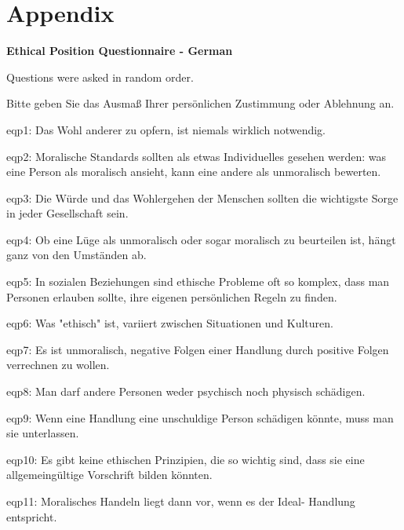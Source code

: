 \newpage
\section{Appendix}

\setcounter{table}{0}
\renewcommand{\thetable}{A\arabic{table}}

\setcounter{figure}{0}
\renewcommand{\thefigure}{A\arabic{figure}}



\textbf{Ethical Position Questionnaire - German}

Questions were asked in random order.

Bitte geben Sie das Ausmaß Ihrer persönlichen Zustimmung oder Ablehnung an.

eqp1: Das Wohl anderer zu opfern, ist niemals wirklich notwendig.

eqp2: Moralische Standards sollten als etwas Individuelles gesehen werden: was eine Person als moralisch ansieht, kann eine andere als unmoralisch bewerten.

eqp3: Die Würde und das Wohlergehen der Menschen sollten die wichtigste Sorge in jeder Gesellschaft sein.

eqp4: Ob eine Lüge als unmoralisch oder sogar moralisch zu beurteilen ist, hängt ganz von den Umständen ab.

eqp5: In sozialen Beziehungen sind ethische Probleme oft so komplex, dass man Personen erlauben sollte, ihre eigenen persönlichen Regeln zu finden.

eqp6: Was "ethisch" ist, variiert zwischen Situationen und Kulturen.

eqp7: Es ist unmoralisch, negative Folgen einer Handlung durch positive Folgen verrechnen zu wollen.

eqp8: Man darf andere Personen weder psychisch noch physisch schädigen.

eqp9: Wenn eine Handlung eine unschuldige Person schädigen könnte, muss man sie unterlassen.

eqp10: Es gibt keine ethischen Prinzipien, die so wichtig sind, dass sie eine allgemeingültige Vorschrift bilden könnten.

eqp11: Moralisches Handeln liegt dann vor, wenn es der Ideal- Handlung entspricht.

